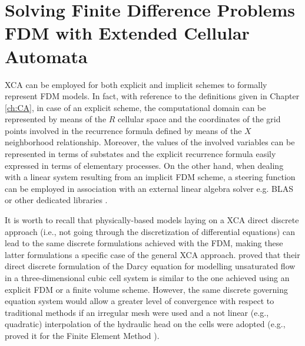         
\section[Solving FDM with XCA]{Solving Finite Difference Problems FDM with Extended Cellular Automata}
    XCA can be employed for both explicit and implicit schemes to formally
    represent FDM models. In fact, with reference to the definitions given in Chapter \ref{ch:CA}, in case of an
    explicit scheme, the computational domain can be represented by
    means of the $R$ cellular space and the coordinates of the grid
    points involved in the recurrence formula defined by means of the
    $X$ neighborhood relationship. Moreover, the values of the involved
    variables can be represented in terms of substates and the
    explicit recurrence formula easily expressed in terms of
    elementary processes. On the other hand, when dealing with a linear system
    resulting from an implicit FDM scheme, a steering function can be
    employed in association with an
    external linear algebra solver e.g. BLAS\cite{2002:USB:567806.567807} or other dedicated libraries\cite{Kestur:2010:BCF:1848074.1848496} .

    It is worth to recall that physically-based models laying on a XCA
    direct discrete approach (i.e., not going through the
    discretization of differential equations) can lead to the same
    discrete formulations achieved with the FDM, making these latter
    formulations a specific case of the general XCA
    approach. \cite{Mendicino2006} proved that
    their direct discrete formulation of the Darcy equation for
    modelling unsaturated flow in a three-dimensional cubic cell
    system is similar to the one achieved using an explicit FDM or a
    finite volume scheme. However, the same discrete governing
    equation system would allow a greater level of convergence with
    respect to traditional methods if an irregular mesh were used
    and a not linear (e.g., quadratic) interpolation of the hydraulic
    head on the cells were adopted (e.g., \citeauthor{Tonti2001237} proved it for the Finite  Element Method \cite{Tonti2001237}). 






